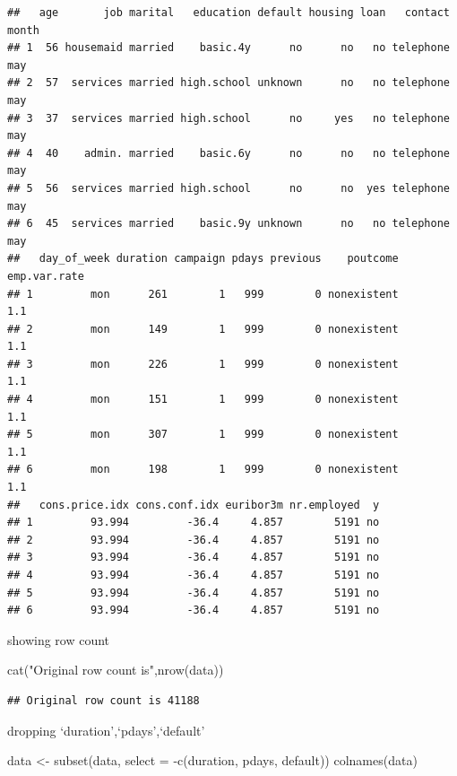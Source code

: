 \documentclass[
]{article}
\newenvironment{Shaded}{\begin{snugshade}}{\end{snugshade}}
\newcommand{\AttributeTok}[1]{\textcolor[rgb]{0.77,0.63,0.00}{#1}}
\newcommand{\FunctionTok}[1]{\textcolor[rgb]{0.00,0.00,0.00}{#1}}
\newcommand{\NormalTok}[1]{#1}
\newcommand{\OtherTok}[1]{\textcolor[rgb]{0.56,0.35,0.01}{#1}}
\newcommand{\SpecialCharTok}[1]{\textcolor[rgb]{0.00,0.00,0.00}{#1}}
\newcommand{\StringTok}[1]{\textcolor[rgb]{0.31,0.60,0.02}{#1}}
\begin{document}
\begin{verbatim}
##   age       job marital   education default housing loan   contact month
## 1  56 housemaid married    basic.4y      no      no   no telephone   may
## 2  57  services married high.school unknown      no   no telephone   may
## 3  37  services married high.school      no     yes   no telephone   may
## 4  40    admin. married    basic.6y      no      no   no telephone   may
## 5  56  services married high.school      no      no  yes telephone   may
## 6  45  services married    basic.9y unknown      no   no telephone   may
##   day_of_week duration campaign pdays previous    poutcome emp.var.rate
## 1         mon      261        1   999        0 nonexistent          1.1
## 2         mon      149        1   999        0 nonexistent          1.1
## 3         mon      226        1   999        0 nonexistent          1.1
## 4         mon      151        1   999        0 nonexistent          1.1
## 5         mon      307        1   999        0 nonexistent          1.1
## 6         mon      198        1   999        0 nonexistent          1.1
##   cons.price.idx cons.conf.idx euribor3m nr.employed  y
## 1         93.994         -36.4     4.857        5191 no
## 2         93.994         -36.4     4.857        5191 no
## 3         93.994         -36.4     4.857        5191 no
## 4         93.994         -36.4     4.857        5191 no
## 5         93.994         -36.4     4.857        5191 no
## 6         93.994         -36.4     4.857        5191 no
\end{verbatim}

showing row count

\begin{Shaded}
\begin{Highlighting}[]
\FunctionTok{cat}\NormalTok{(}\StringTok{"Original row count is"}\NormalTok{,}\FunctionTok{nrow}\NormalTok{(data))}
\end{Highlighting}
\end{Shaded}

\begin{verbatim}
## Original row count is 41188
\end{verbatim}

dropping `duration',`pdays',`default'

\begin{Shaded}
\begin{Highlighting}[]
\NormalTok{data }\OtherTok{\textless{}{-}} \FunctionTok{subset}\NormalTok{(data, }\AttributeTok{select =} \SpecialCharTok{{-}}\FunctionTok{c}\NormalTok{(duration, pdays, default))}
\FunctionTok{colnames}\NormalTok{(data)}
\end{Highlighting}
\end{Shaded}
\end{document}
